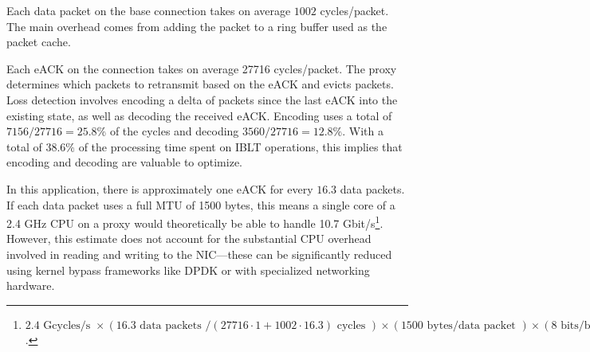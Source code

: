 Each data packet on the base connection takes on average $1002$ cycles/packet.
The main overhead comes from adding the packet to a ring buffer used as the
packet cache.

Each eACK on the \Sys connection takes on average 27716 cycles/packet. The
proxy determines which packets to retransmit based on the eACK and evicts
packets. Loss detection involves encoding a delta of packets since the last
eACK into the existing state, as well as decoding the received eACK. Encoding
uses a total of $7156/27716 = 25.8\%$ of the cycles and decoding $3560/27716 =
12.8\%$. With a total of $38.6\%$ of the processing time spent on IBLT
operations, this implies that encoding and decoding are valuable to optimize.



In this application, there is approximately one eACK for every $16.3$ data
packets. If each data packet uses a full MTU of 1500 bytes, this means a single
core of a 2.4 GHz CPU on a proxy would theoretically be able to handle 10.7
Gbit/s\footnote{ $2.4\text{ Gcycles/s }
\times(16.3 \text{ data packets } / (27716\cdot1 + 1002\cdot16.3) \text{ cycles })
\times (1500 \text{ bytes/data packet })
\times (8 \text{ bits/byte })
= 10.7 \text{ Gbit/s}$.
}. However, this estimate does not account for the substantial CPU overhead
involved in reading and writing to the NIC---these can be significantly reduced
using kernel bypass frameworks like DPDK or with specialized networking
hardware.



% 

